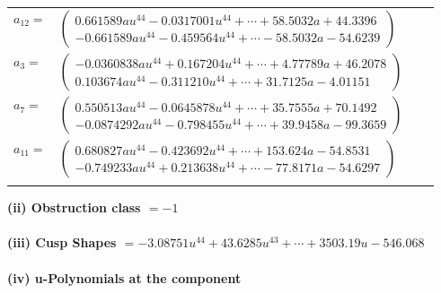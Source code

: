 \documentclass[1p]{elsarticle_modified}
\theoremstyle{definition}
\begin{document}
\begin{tabular}{m{7pt} m{180pt} m{7pt} m{180pt} }
\flushright $a_{12}=$&$\begin{pmatrix}0.661589 a u^{44}-0.0317001 u^{44}+\cdots+58.5032 a+44.3396\\-0.661589 a u^{44}-0.459564 u^{44}+\cdots-58.5032 a-54.6239\end{pmatrix}$ \\
\flushright $a_{3}=$&$\begin{pmatrix}-0.0360838 a u^{44}+0.167204 u^{44}+\cdots+4.77789 a+46.2078\\0.103674 a u^{44}-0.311210 u^{44}+\cdots+31.7125 a-4.01151\end{pmatrix}$ \\
\flushright $a_{7}=$&$\begin{pmatrix}0.550513 a u^{44}-0.0645878 u^{44}+\cdots+35.7555 a+70.1492\\-0.0874292 a u^{44}-0.798455 u^{44}+\cdots+39.9458 a-99.3659\end{pmatrix}$ \\
\flushright $a_{11}=$&$\begin{pmatrix}0.680827 a u^{44}-0.423692 u^{44}+\cdots+153.624 a-54.8531\\-0.749233 a u^{44}+0.213638 u^{44}+\cdots-77.8171 a-54.6297\end{pmatrix}$\\&\end{tabular}
\flushleft \textbf{(ii) Obstruction class $= -1$}\\~\\
\flushleft \textbf{(iii) Cusp Shapes $= -3.08751 u^{44}+43.6285 u^{43}+\cdots+3503.19 u-546.068$}\\~\\
\newpage\renewcommand{\arraystretch}{1}
\flushleft \textbf{(iv) u-Polynomials at the component}\newline \\
\end{document}
